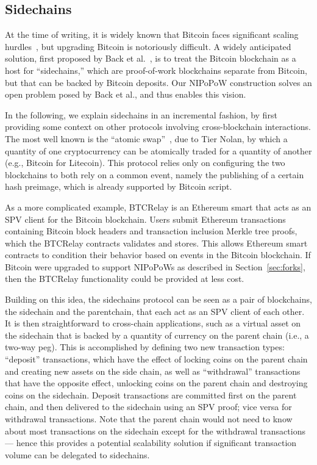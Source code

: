 \subsection{Sidechains}
\label{sec:sidechains}
At the time of writing, it is widely known that Bitcoin faces significant scaling hurdles~\cite{onscaling}, but upgrading Bitcoin is notoriously difficult.
A widely anticipated solution, first proposed by Back et al.~\cite{sidechains}, is to treat the Bitcoin blockchain as a host for ``sidechains,'' which are proof-of-work blockchains separate from Bitcoin, but that can be backed by Bitcoin deposits. Our NIPoPoW construction solves an open problem posed by Back et al., and thus enables this vision.

In the following, we explain sidechains in an incremental fashion, by first providing some context on other protocols involving cross-blockchain interactions. The most well known is the ``atomic swap''~\cite{tiernolan}, due to Tier Nolan, by which a quantity of one cryptocurrency can be atomically traded for a quantity of another (e.g., Bitcoin for Litecoin). This protocol relies only on configuring the two blockchains to both rely on a common event, namely the publishing of a certain hash preimage, which is already supported by Bitcoin script.

As a more complicated example, BTCRelay is an Ethereum \cite{ethereum} smart  that acts as an SPV client for the Bitcoin blockchain.
Users submit Ethereum transactions containing Bitcoin block headers and transaction inclusion Merkle tree proofs, which the BTCRelay contracts validates and stores. This allows Ethereum smart contracts to condition their behavior based on events in the Bitcoin blockchain.
If Bitcoin were upgraded to support NIPoPoWs as described in Section~\ref{sec:forks}, then the BTCRelay functionality could be provided at less cost.

Building on this idea, the sidechains protocol can be seen as a pair of blockchains, the sidechain and the parentchain, that each act as an SPV client of each other.
It is then straightforward to cross-chain applications, such as a virtual asset on the sidechain that is backed by a quantity of currency on the parent chain (i.e., a two-way peg).
This is accomplished by defining two new transaction types: ``deposit'' transactions, which have the effect of locking coins on the parent chain and creating new assets on the side chain, as well as ``withdrawal'' transactions that have the opposite effect, unlocking coins on the parent chain and destroying coins on the sidechain. Deposit transactions are committed first on the parent chain, and then delivered to the sidechain using an SPV proof; vice versa for withdrawal transactions. Note that the parent chain would not need to know about most transactions on the sidechain except for the withdrawal transactions --- hence this provides a potential scalability solution if significant transaction volume can be delegated to sidechains.

